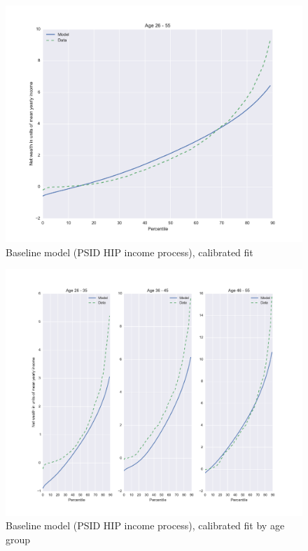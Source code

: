 \begin{figure}%
\includegraphics[width=\columnwidth]{baseline}%
\caption{Baseline model (PSID HIP income process), calibrated fit}%
\label{fig:baseline}%
\end{figure}

\begin{figure}%
\includegraphics[width=\columnwidth]{baseline_agedetail}%
\caption{Baseline model (PSID HIP income process), calibrated fit by age group}%
\label{fig:baseline_agedetail}%
\end{figure}


